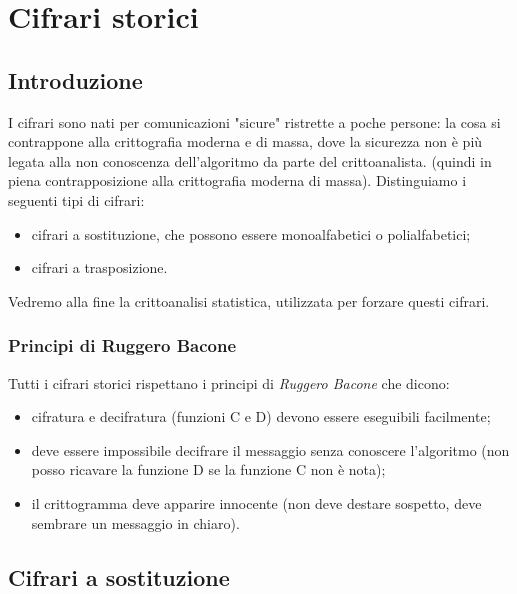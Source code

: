 \part{Cifrari storici}
\chapter{Introduzione}
I cifrari sono nati per comunicazioni "sicure" ristrette a poche persone: la cosa si contrappone alla crittografia moderna e di massa, dove la sicurezza non è più legata alla non conoscenza dell'algoritmo da parte del crittoanalista. (quindi in piena contrapposizione alla crittografia moderna di massa). Distinguiamo i seguenti tipi di cifrari:
\begin{itemize}
	\item cifrari a sostituzione, che possono essere monoalfabetici o polialfabetici;
	\item cifrari a trasposizione.
\end{itemize}
Vedremo alla fine la crittoanalisi statistica, utilizzata per forzare questi cifrari.
\section{Principi di Ruggero Bacone} 
Tutti i cifrari storici rispettano i principi di \emph{Ruggero Bacone} che dicono:
\begin{itemize}
    \item cifratura e decifratura (funzioni C e D) devono essere eseguibili facilmente;
    \item deve essere impossibile decifrare il messaggio senza conoscere l'algoritmo (non posso ricavare la funzione D se la funzione C non è nota);
    \item il crittogramma deve apparire innocente (non deve destare sospetto, deve sembrare un messaggio in chiaro).
\end{itemize}

\chapter{Cifrari a sostituzione}
